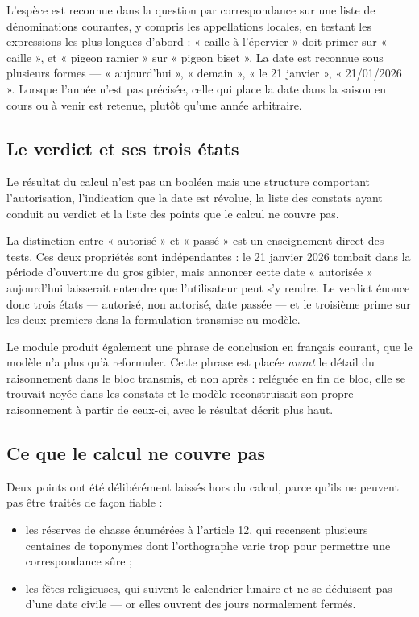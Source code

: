 L'espèce est reconnue dans la question par correspondance sur une liste de
dénominations courantes, y compris les appellations locales, en testant les
expressions les plus longues d'abord : « caille à l'épervier » doit primer sur
« caille », et « pigeon ramier » sur « pigeon biset ». La date est reconnue sous
plusieurs formes — « aujourd'hui », « demain », « le 21 janvier », « 21/01/2026 ».
Lorsque l'année n'est pas précisée, celle qui place la date dans la saison en
cours ou à venir est retenue, plutôt qu'une année arbitraire.

\subsection{Le verdict et ses trois états}
\label{sec:verdict}

Le résultat du calcul n'est pas un booléen mais une structure comportant
l'autorisation, l'indication que la date est révolue, la liste des constats
ayant conduit au verdict et la liste des points que le calcul ne couvre pas.

La distinction entre « autorisé » et « passé » est un enseignement direct des
tests. Ces deux propriétés sont indépendantes : le 21 janvier 2026 tombait dans
la période d'ouverture du gros gibier, mais annoncer cette date « autorisée »
aujourd'hui laisserait entendre que l'utilisateur peut s'y rendre. Le verdict
énonce donc trois états — autorisé, non autorisé, date passée — et le troisième
prime sur les deux premiers dans la formulation transmise au modèle.

Le module produit également une phrase de conclusion en français courant, que le
modèle n'a plus qu'à reformuler. Cette phrase est placée \emph{avant} le détail
du raisonnement dans le bloc transmis, et non après : reléguée en fin de bloc,
elle se trouvait noyée dans les constats et le modèle reconstruisait son propre
raisonnement à partir de ceux-ci, avec le résultat décrit plus haut.

\subsection{Ce que le calcul ne couvre pas}

Deux points ont été délibérément laissés hors du calcul, parce qu'ils ne peuvent
pas être traités de façon fiable :

\begin{itemize}
  \item les réserves de chasse énumérées à l'article 12, qui recensent plusieurs
        centaines de toponymes dont l'orthographe varie trop pour permettre une
        correspondance sûre ;
  \item les fêtes religieuses, qui suivent le calendrier lunaire et ne se
        déduisent pas d'une date civile — or elles ouvrent des jours
        normalement fermés.
\end{itemize}


